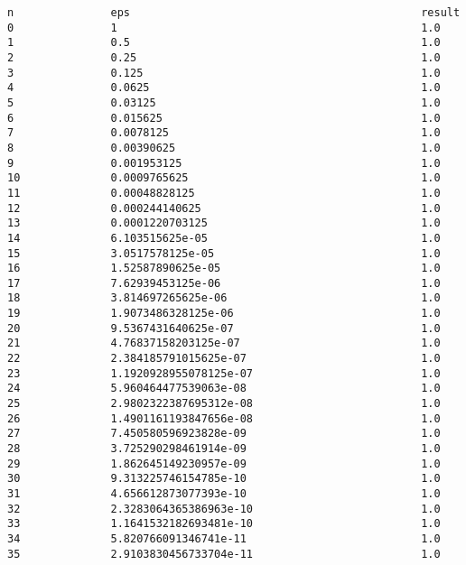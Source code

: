 \documentclass[11pt]{article}
\begin{document}
    \begin{Verbatim}[commandchars=\\\{\}]
n               eps                                             result
0               1                                               1.0
1               0.5                                             1.0
2               0.25                                            1.0
3               0.125                                           1.0
4               0.0625                                          1.0
5               0.03125                                         1.0
6               0.015625                                        1.0
7               0.0078125                                       1.0
8               0.00390625                                      1.0
9               0.001953125                                     1.0
10              0.0009765625                                    1.0
11              0.00048828125                                   1.0
12              0.000244140625                                  1.0
13              0.0001220703125                                 1.0
14              6.103515625e-05                                 1.0
15              3.0517578125e-05                                1.0
16              1.52587890625e-05                               1.0
17              7.62939453125e-06                               1.0
18              3.814697265625e-06                              1.0
19              1.9073486328125e-06                             1.0
20              9.5367431640625e-07                             1.0
21              4.76837158203125e-07                            1.0
22              2.384185791015625e-07                           1.0
23              1.1920928955078125e-07                          1.0
24              5.960464477539063e-08                           1.0
25              2.9802322387695312e-08                          1.0
26              1.4901161193847656e-08                          1.0
27              7.450580596923828e-09                           1.0
28              3.725290298461914e-09                           1.0
29              1.862645149230957e-09                           1.0
30              9.313225746154785e-10                           1.0
31              4.656612873077393e-10                           1.0
32              2.3283064365386963e-10                          1.0
33              1.1641532182693481e-10                          1.0
34              5.820766091346741e-11                           1.0
35              2.9103830456733704e-11                          1.0

\end{Verbatim}
\end{document}
